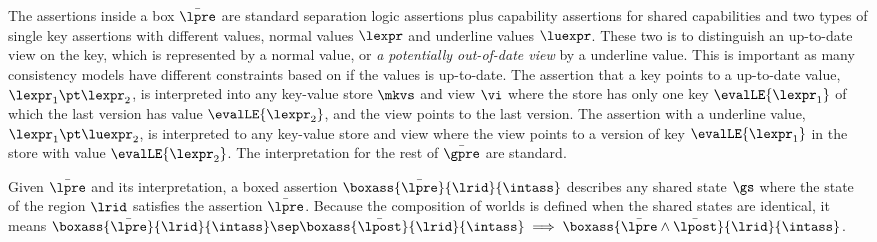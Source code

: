 The assertions inside a box \( \bar{\lpre} \) are standard separation logic assertions plus capability assertions for shared capabilities and two types of single key assertions with different values, normal values \( \lexpr \) and underline values \( \luexpr \).
These two is to distinguish an up-to-date view on the key, which is represented by a normal value, or \emph{a potentially out-of-date view} by a underline value.
This is important as many consistency models have different constraints based on if the values is up-to-date.
The assertion that a key points to a up-to-date value, \( \lexpr_1 \pt \lexpr_2 \), is interpreted into any key-value store \( \mkvs \) and view \( \vi \) where the store has only one key \( \evalLE{\lexpr_1 }\) of which the last version has value \( \evalLE{\lexpr_2}\), and the view points to the last version.
The assertion with a underline value, \( \lexpr_1 \pt \luexpr_2 \), is interpreted to any key-value store and view where the view points to a version of key \( \evalLE{\lexpr_1 }\) in the store with value \( \evalLE{\lexpr_2}\).
The interpretation for the rest of \( \bar{\gpre} \) are standard.

Given \( \bar{\lpre} \) and its interpretation, a boxed assertion \( \boxass{\bar{\lpre}}{\lrid}{\intass} \) describes any shared state \( \gs \) where the state of the region \( \lrid \) satisfies the assertion \( \bar{\lpre} \).
Because the composition of worlds is defined when the shared states are identical, it means \( \boxass{\bar{\lpre}}{\lrid}{\intass} \sep \boxass{\bar{\lpost}}{\lrid}{\intass} \implies \boxass{\bar{\lpre} \land \bar{\lpost} }{\lrid}{\intass} \).

